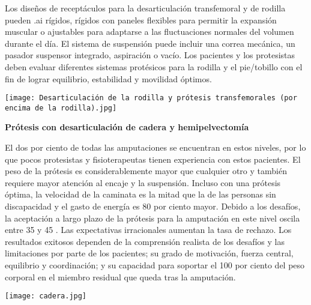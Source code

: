 \documentclass{article}
\begin{document}
\hspace{1cm} 

Los diseños de receptáculos para la desarticulación transfemoral y de rodilla pueden .ai rígidos, rígidos con paneles flexibles para permitir la expansión muscular o ajustables para adaptarse a las fluctuaciones normales del volumen durante el día. El sistema de suspensión puede incluir una correa mecánica, un pasador suspensor integrado, aspiración o vacío. Los pacientes y los protesistas deben evaluar diferentes sistemas protésicos para la rodilla y el pie/tobillo con el fin de lograr equilibrio, estabilidad y movilidad óptimos.

\hspace{1cm} 

\begin{minipage}{.89\linewidth}
\centering
\texttt{[image: Desarticulación de la rodilla y prótesis transfemorales (por encima de la rodilla).jpg]}
\end{minipage}


\clearpage


\textbf {Prótesis con desarticulación de cadera y hemipelvectomía}

\hspace{1cm} 

El dos por ciento  de todas las amputaciones se encuentran en estos niveles, por lo que pocos protesistas y fisioterapeutas tienen experiencia con estos pacientes. El peso de la prótesis es considerablemente mayor que cualquier otro y también requiere mayor atención al encaje y la suspensión. Incluso con una prótesis óptima, la velocidad de la caminata es la mitad que la de las personas sin discapacidad y el gasto de energía es 80 por ciento mayor. Debido a los desafíos, la aceptación a largo plazo de la prótesis para la amputación en este nivel oscila entre 35 y 45 . Las expectativas irracionales aumentan la tasa de rechazo. Los resultados exitosos dependen de la comprensión realista de los desafíos y las limitaciones por parte de los pacientes; su grado de motivación, fuerza central, equilibrio y coordinación; y su capacidad para soportar el 100 por ciento  del peso corporal en el miembro residual que queda tras la amputación.

\hspace{1cm} 

\begin{minipage}{.89\linewidth}
\centering
\texttt{[image: cadera.jpg]}
\end{minipage}
\end{document}

